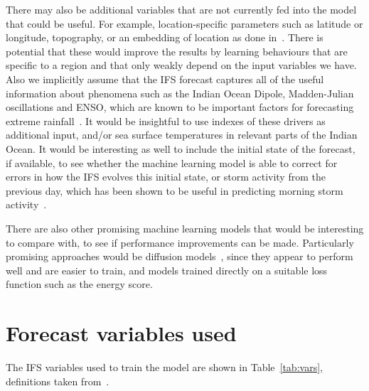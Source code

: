 \documentclass{article}
\begin{document}

There may also be additional variables that are not currently fed into the model that could be useful. For example, location-specific parameters such as latitude or longitude, topography, or an embedding of location as done in~\cite{rasp_neural_2018}. There is potential that these would improve the results by learning behaviours that are specific to a region and that only weakly depend on the input variables we have. Also we implicitly assume that the IFS forecast captures all of the useful information about phenomena such as the Indian Ocean Dipole, Madden-Julian oscillations and ENSO, which are known to be important factors for forecasting extreme rainfall~\citep{wainwright_extreme_2021, palmer_drivers_2023}. It would be insightful to use indexes of these drivers as additional input, and/or sea surface temperatures in relevant parts of the Indian Ocean. It would be interesting as well to include the initial state of the forecast, if available, to see whether the machine learning model is able to correct for errors in how the IFS evolves this initial state, or storm activity from the previous day, which has been shown to be useful in predicting morning storm activity~\citep{thiery_early_2017}. 

There are also other promising machine learning models that would be interesting to compare with, to see if performance improvements can be made. Particularly promising approaches would be diffusion models~\citep{addison_machine_2022, leinonen_latent_2023}, since they appear to perform well and are easier to train, and models trained directly on a suitable loss function such as the energy score.



\appendix

\section{Forecast variables used}\label{app:fcst_vars}
The IFS variables used to train the model are shown in Table~\ref{tab:vars}, definitions taken from~\citep{ecmwf_parameter_2023}.
\end{document}

